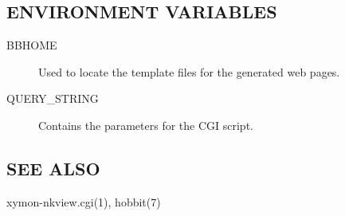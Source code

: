 \subsection{ENVIRONMENT VARIABLES}
\begin{description}
\item[BBHOME] Used to locate the template files for the generated web pages. 


\item[QUERY\_STRING] Contains the parameters for the CGI script. 

\end{description}
\subsection{SEE ALSO}
xymon-nkview.cgi(1), hobbit(7) 


